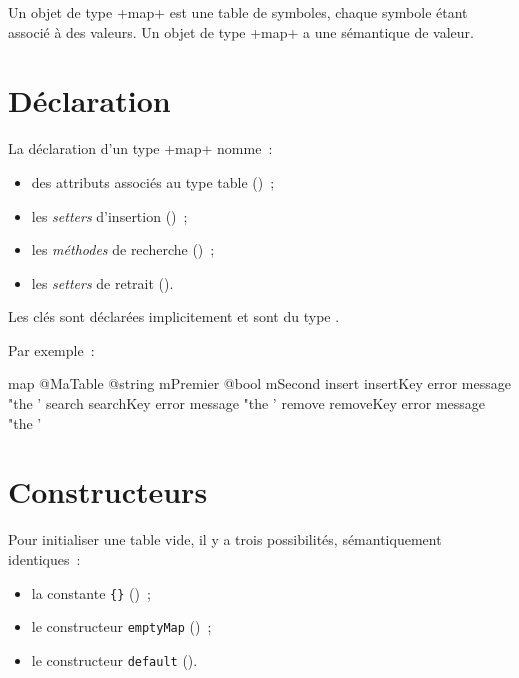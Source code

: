

Un objet de type \ggs+map+ est une table de symboles, chaque symbole étant associé à des valeurs. Un objet de type \ggs+map+ a une sémantique de valeur.

\section{Déclaration}

La déclaration d'un type \ggs+map+ nomme~:
\begin{itemize}
  \item des attributs associés au type table ()~;
  \item les \emph{setters} d'insertion ()~;
  \item les \emph{méthodes} de recherche ()~;
  \item les \emph{setters} de retrait ().
\end{itemize}

Les clés sont déclarées implicitement et sont du type .

Par exemple~:

\begin{galgas}
map @MaTable {
  @string mPremier
  @bool mSecond
  insert insertKey error message "the '%
  search searchKey error message "the '%
  remove removeKey error message "the '%
}
\end{galgas}







\section{Constructeurs}

Pour initialiser une table vide, il y a trois possibilités, sémantiquement identiques~:
\begin{itemize}
  \item la constante \texttt{\{\}} ()~; 
  \item le constructeur \texttt{emptyMap} ()~; 
  \item le constructeur \texttt{default} (). 
\end{itemize}


